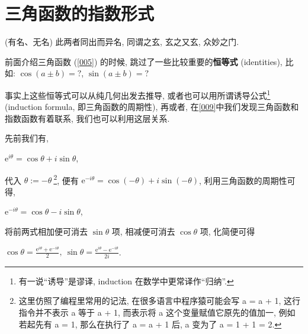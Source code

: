 \section{三角函数的指数形式}\label{010}

\begin{flushright}{\kaishu (有名、无名) 此两者同出而异名, 同谓之玄, 玄之又玄, 众妙之门.}\end{flushright}

前面介绍三角函数 (\ref{005}) 的时候, 跳过了一些比较重要的\textbf{恒等式}
(identities), 比如: $\cos (a\pm b)=?$, $\sin (a\pm  b)=?$

事实上这些恒等式可以从纯几何出发去推导,
或者也可以用所谓诱导公式\footnote{有一说``诱导''是谬译, induction
  在数学中更常译作``归纳''.} (induction formula, 即三角函数的周期性),
再或者, 在\ref{009}中我们发现三角函数和指数函数有着联系,
我们也可以利用这层关系.

\begin{tcolorbox}[size=fbox, breakable, enhanced jigsaw, title={三角函数的指数形式}]

先前我们有,

$\mathrm{e}^{i\theta}=\cos \theta+i\sin \theta$,

代入 $\theta:=-\theta\  $\footnote{这里仿照了编程里常用的记法,
  在很多语言中程序猿可能会写 a = a + 1, 这行指令并不表示 a 等于 a + 1,
  而表示将 a 这个变量赋值它原先的值加一, 例如若起先有 a = 1,
  那么在执行了 a = a + 1 后, a 变为了 a = 1 + 1 = 2.}, 便有
$\mathrm{e}^{-i\theta}=\cos (-\theta)+i\sin (-\theta)$,
利用三角函数的周期性可得,

$\mathrm{e}^{-i\theta}=\cos \theta-i\sin \theta$,

将前两式相加便可消去 $\sin\theta$ 项, 相减便可消去 $\cos\theta$ 项,
化简便可得

$\boxed{\cos\theta=\frac{\mathrm{e}^{i\theta}+\mathrm{e}^{-i\theta}}{2},\ \sin\theta=\frac{\mathrm{e}^{i\theta}-\mathrm{e}^{-i\theta}}{2i}}$.

\end{tcolorbox}

